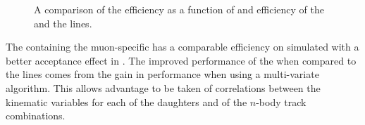 \begin{figure}[tbp]
\centering
{}
\caption[Comparison of the trigger line efficiency on \BdToKstmm.]
{ A comparison of the efficiency as a function of \ctl and \qsq efficiency of the \muntrack and the \hlttwotopo lines. ~\label{fig:trigdev:eff:comp} }
\end{figure}
The \hlttwotopo containing the muon-specific \mutopo has a comparable efficiency on simulated \BdToKstmm with a better acceptance effect in \ctl.
The improved performance of the \hlttwotopo when compared to the \muntrack lines comes from the gain in performance when using a multi-variate algorithm.
This allows advantage to be taken of correlations between the kinematic variables for each of the daughters and of the $n$-body track combinations.




